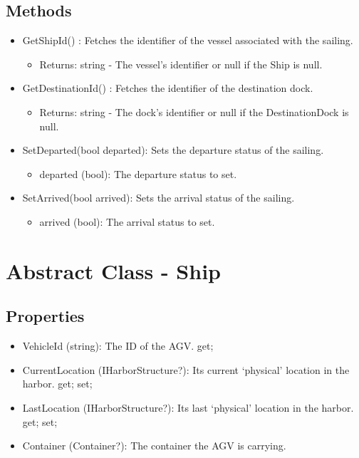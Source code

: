 \documentclass[12pt]{article}
\begin{document}
\subsection*{Methods}
\begin{itemize}
    \item GetShipId() : Fetches the identifier of the vessel associated with the sailing.
    \begin{itemize}
        \item Returns: string - The vessel's identifier or null if the Ship is null.
    \end{itemize}
    \item GetDestinationId() : Fetches the identifier of the destination dock.
    \begin{itemize}
        \item Returns: string - The dock's identifier or null if the DestinationDock is null.
    \end{itemize}
    \item SetDeparted(bool departed): Sets the departure status of the sailing.
    \begin{itemize}
        \item departed (bool): The departure status to set.
    \end{itemize}
    \item SetArrived(bool arrived): Sets the arrival status of the sailing.
    \begin{itemize}
        \item arrived (bool): The arrival status to set.
    \end{itemize}
\end{itemize}

\newpage
\section*{Abstract Class - Ship}
\subsection*{Properties}
    \begin{itemize}
        \item VehicleId (string): The ID of the AGV. {get;}
        \item CurrentLocation (IHarborStructure?): Its current `physical' location in the harbor. { get; set; }
        \item LastLocation (IHarborStructure?): Its last `physical' location in the harbor. { get; set; }
        \item Container (Container?): The container the AGV is carrying.
    \end{itemize}
\end{document}
